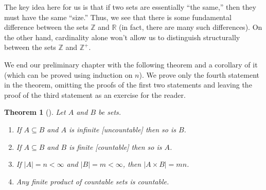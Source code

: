 \documentclass[10pt,]{book}
\theoremstyle{plain}
\newtheorem{theorem}{Theorem}[section]
\theoremstyle{definition}
\theoremstyle{definition}
\theoremstyle{definition}
\theoremstyle{definition}
\numberwithin{equation}{section}
\def\Z{\mathbb{Z}}
\def\R{\mathbb{R}}
\newcommand{\lt}{<}
\begin{document}
\par
The key idea here for us is that if two sets are essentially ``the same,'' then they must have the same ``size.'' Thus, we see that there is some fundamental difference between the sets \(\Z\) and \(\R\) (in fact, there are many such differences). On the other hand, cardinality alone won't allow us to distinguish structurally between the sets \(\Z\) and \(\Z^+\).%
\par
We end our preliminary chapter with the following theorem and a corollary of it (which can be proved using induction on \(n\)). We prove only the fourth statement in the theorem, omitting the proofs of the first two statements and leaving the proof of the third statement as an exercise for the reader.%
\begin{theorem}[{}]\label{cardthm}
Let \(A\) and \(B\) be sets. \leavevmode%
\begin{enumerate}
\item\hypertarget{li-19}{}If \(A\subseteq B\) and \(A\) is infinite [uncountable] then so is \(B\).%
\item\hypertarget{li-20}{}If \(A\subseteq B\) and \(B\) is finite [countable] then so is \(A\).%
\item\hypertarget{li-21}{}If \(|A|=n\lt \infty\) and \(|B|=m\lt  \infty\), then \(|A\times B|=mn\).%
\item\hypertarget{li-22}{}Any finite product of countable sets is countable.%
\end{enumerate}
%
\end{theorem}
\end{document}
